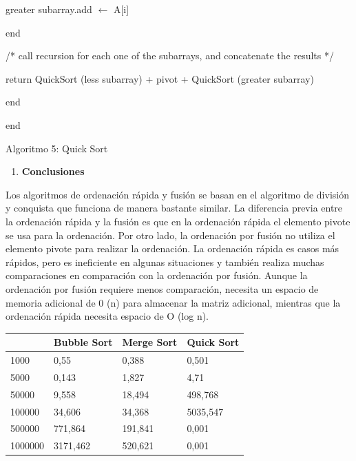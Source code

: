 \documentclass{article} %
\begin{document}
\noindent greater subarray.add $\mathrm{\leftarrow}$ A[i]

\noindent end

\noindent /* call recursion for each one of the subarrays, and concatenate the results */

\noindent return QuickSort (less subarray) + pivot + QuickSort (greater subarray)

\noindent end

\noindent end

\noindent Algoritmo 5: Quick Sort

\noindent 

\begin{enumerate}
\item  \textbf{Conclusiones}
\end{enumerate}

\noindent \textbf{}

\noindent Los algoritmos de ordenaci\'{o}n r\'{a}pida y fusi\'{o}n se basan en el algoritmo de divisi\'{o}n y conquista que funciona de manera bastante similar. La diferencia previa entre la ordenaci\'{o}n r\'{a}pida y la fusi\'{o}n es que en la ordenaci\'{o}n r\'{a}pida el elemento pivote se usa para la ordenaci\'{o}n. Por otro lado, la ordenaci\'{o}n por fusi\'{o}n no utiliza el elemento pivote para realizar la ordenaci\'{o}n. La ordenaci\'{o}n r\'{a}pida es casos m\'{a}s r\'{a}pidos, pero es ineficiente en algunas situaciones y tambi\'{e}n realiza muchas comparaciones en comparaci\'{o}n con la ordenaci\'{o}n por fusi\'{o}n. Aunque la ordenaci\'{o}n por fusi\'{o}n requiere menos comparaci\'{o}n, necesita un espacio de memoria adicional de 0 (n) para almacenar la matriz adicional, mientras que la ordenaci\'{o}n r\'{a}pida necesita espacio de O (log n).

\noindent \textbf{}

\begin{tabular}{|p{0.8in}|p{0.6in}|p{0.6in}|p{0.6in}|} \hline 
~ & Bubble Sort & Merge Sort & Quick Sort \\ \hline 
1000 & 0,55 & 0,388 & 0,501 \\ \hline 
5000 & 0,143 & 1,827 & 4,71 \\ \hline 
50000 & 9,558 & 18,494 & 498,768 \\ \hline 
100000 & 34,606 & 34,368 & 5035,547 \\ \hline 
500000 & 771,864 & 191,841 & 0,001 \\ \hline 
1000000 & 3171,462 & 520,621 & 0,001 \\ \hline 
\end{tabular}
\end{document}
